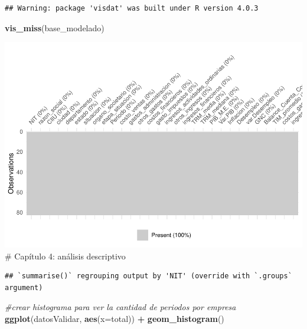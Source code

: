 \documentclass[
  11pt,
]{article}
\newenvironment{Shaded}{\begin{snugshade}}{\end{snugshade}}
\newcommand{\CommentTok}[1]{\textcolor[rgb]{0.56,0.35,0.01}{\textit{#1}}}
\newcommand{\DataTypeTok}[1]{\textcolor[rgb]{0.13,0.29,0.53}{#1}}
\newcommand{\KeywordTok}[1]{\textcolor[rgb]{0.13,0.29,0.53}{\textbf{#1}}}
\newcommand{\NormalTok}[1]{#1}
\newcommand{\OperatorTok}[1]{\textcolor[rgb]{0.81,0.36,0.00}{\textbf{#1}}}
\newcommand{\StringTok}[1]{\textcolor[rgb]{0.31,0.60,0.02}{#1}}
\begin{document}
\begin{verbatim}
## Warning: package 'visdat' was built under R version 4.0.3
\end{verbatim}

\begin{Shaded}
\begin{Highlighting}[]
\KeywordTok{vis_miss}\NormalTok{(base_modelado)}
\end{Highlighting}
\end{Shaded}

\includegraphics{index_files/figure-latex/unnamed-chunk-4-1.pdf} \#
Capítulo 4: análisis descriptivo

\begin{Shaded}
\end{Shaded}

\begin{verbatim}
## `summarise()` regrouping output by 'NIT' (override with `.groups` argument)
\end{verbatim}

\begin{Shaded}
\begin{Highlighting}[]
\CommentTok{#crear histograma para ver la cantidad de periodos por empresa}
\KeywordTok{ggplot}\NormalTok{(datosValidar, }\KeywordTok{aes}\NormalTok{(}\DataTypeTok{x=}\NormalTok{total)) }\OperatorTok{+}\StringTok{ }\KeywordTok{geom_histogram}\NormalTok{()}
\end{Highlighting}
\end{Shaded}
\end{document}
